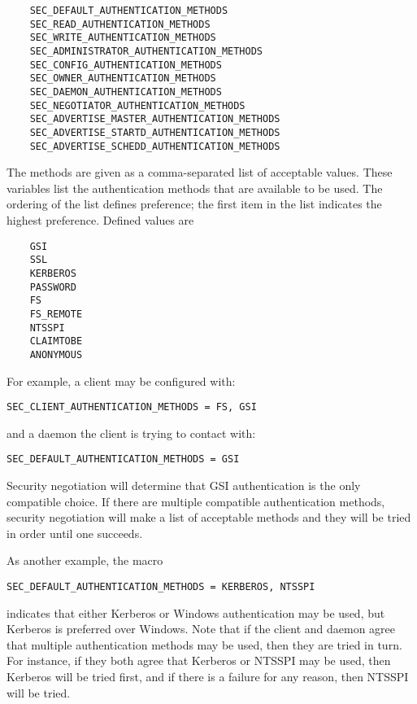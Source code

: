\begin{verbatim}
    SEC_DEFAULT_AUTHENTICATION_METHODS
    SEC_READ_AUTHENTICATION_METHODS
    SEC_WRITE_AUTHENTICATION_METHODS
    SEC_ADMINISTRATOR_AUTHENTICATION_METHODS
    SEC_CONFIG_AUTHENTICATION_METHODS
    SEC_OWNER_AUTHENTICATION_METHODS
    SEC_DAEMON_AUTHENTICATION_METHODS
    SEC_NEGOTIATOR_AUTHENTICATION_METHODS
    SEC_ADVERTISE_MASTER_AUTHENTICATION_METHODS
    SEC_ADVERTISE_STARTD_AUTHENTICATION_METHODS
    SEC_ADVERTISE_SCHEDD_AUTHENTICATION_METHODS
\end{verbatim}
The methods are
given as a comma-separated list of acceptable values.
These variables list the authentication methods that are available
to be used.
The ordering of the list defines preference;
the first item in the list indicates the highest preference.
Defined values are
\begin{verbatim}
    GSI
    SSL
    KERBEROS
    PASSWORD
    FS
    FS_REMOTE
    NTSSPI
    CLAIMTOBE
    ANONYMOUS
\end{verbatim}

For example, a client may be configured with:
\begin{verbatim}
SEC_CLIENT_AUTHENTICATION_METHODS = FS, GSI
\end{verbatim}
and a daemon the client is trying to contact with:
\begin{verbatim}
SEC_DEFAULT_AUTHENTICATION_METHODS = GSI
\end{verbatim}

Security negotiation will determine that GSI authentication is the only
compatible choice. If there are multiple compatible authentication
methods, security negotiation will make a list of acceptable methods and
they will be tried in order until one succeeds. 

As another example, the macro
\begin{verbatim}
SEC_DEFAULT_AUTHENTICATION_METHODS = KERBEROS, NTSSPI
\end{verbatim}
indicates that either Kerberos or Windows authentication may be used,
but Kerberos is preferred over Windows.
Note that if the client and daemon agree that multiple authentication
methods may be used, then they are tried in turn. For instance, if
they both agree that Kerberos or NTSSPI may be used, then Kerberos
will be tried first, and if there is a failure for any reason, then
NTSSPI will be tried. 

